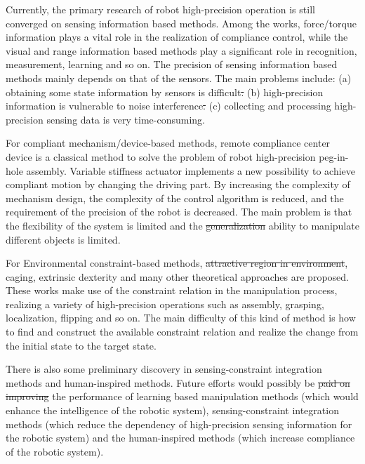 \documentclass[journal,twoside,web]{ieeecolor}
\providecommand{\DIFadd}[1]{{\protect\color{blue}\uwave{#1}}} %
\providecommand{\DIFdel}[1]{{\protect\color{red}\sout{#1}}}                      %
\providecommand{\DIFaddbegin}{} %
\providecommand{\DIFaddend}{} %
\providecommand{\DIFdelbegin}{} %
\providecommand{\DIFdelend}{} %
\newcommand{\DIFscaledelfig}{0.5}
\newlength{\DIFdelgraphicswidth} %
\newlength{\DIFdelgraphicsheight} %
\newcommand{\DIFaddincludegraphics}[2][]{{\color{blue}\fbox{\DIFOincludegraphics[#1]{#2}}}} %
\newcommand{\DIFdelincludegraphics}[2][]{%
\sbox{\DIFdelgraphicsbox}{\DIFOincludegraphics[#1]{#2}}%
\settoboxwidth{\DIFdelgraphicswidth}{\DIFdelgraphicsbox} %
\settoboxtotalheight{\DIFdelgraphicsheight}{\DIFdelgraphicsbox} %
\scalebox{\DIFscaledelfig}{%
\parbox[b]{\DIFdelgraphicswidth}{\usebox{\DIFdelgraphicsbox}\\[-\baselineskip] \rule{\DIFdelgraphicswidth}{0em}}\llap{\resizebox{\DIFdelgraphicswidth}{\DIFdelgraphicsheight}{%
\setlength{\unitlength}{\DIFdelgraphicswidth}%
\begin{picture}(1,1)%
\thicklines\linethickness{2pt} %
{\color[rgb]{1,0,0}\put(0,0){\framebox(1,1){}}}%
{\color[rgb]{1,0,0}\put(0,0){\line( 1,1){1}}}%
{\color[rgb]{1,0,0}\put(0,1){\line(1,-1){1}}}%
\end{picture}%
}\hspace*{3pt}}} %
} %
\DeclareRobustCommand{\DIFaddbegin}{\DIFOaddbegin \let\includegraphics\DIFaddincludegraphics} %
\DeclareRobustCommand{\DIFaddend}{\DIFOaddend \let\includegraphics\DIFOincludegraphics} %
\DeclareRobustCommand{\DIFdelbegin}{\DIFOdelbegin \let\includegraphics\DIFdelincludegraphics} %
\DeclareRobustCommand{\DIFdelend}{\DIFOaddend \let\includegraphics\DIFOincludegraphics} %
\begin{document}
Currently, the primary research of robot high-precision operation is still converged on sensing information based methods. 
Among the works, force/torque information plays a vital role in the realization of compliance control, while the visual and range information based methods play a significant role in recognition, measurement, learning and so on. 
The precision of sensing information based methods mainly depends on that of the sensors. 
The main problems include: 
(a) obtaining some state information by sensors is difficult\DIFdelbegin \DIFdel{. 
}\DIFdelend \DIFaddbegin \DIFadd{, 
}\DIFaddend (b) high-precision information is vulnerable to noise interference\DIFdelbegin \DIFdel{. 
}\DIFdelend \DIFaddbegin \DIFadd{, and  
}\DIFaddend (c) collecting and processing high-precision sensing data is very time-consuming.

For compliant mechanism/device-based methods, 
\DIFaddbegin \DIFadd{the }\DIFaddend remote compliance center device is a classical method to solve the problem of robot high-precision peg-in-hole assembly. 
Variable stiffness actuator implements a new possibility to achieve compliant motion by changing the driving part.
By increasing the complexity of \DIFaddbegin \DIFadd{the }\DIFaddend mechanism design, the complexity of the control algorithm is reduced, and the requirement of the precision of the robot is decreased. 
The main problem is that the flexibility of the system is limited and the \DIFdelbegin \DIFdel{generalization }\DIFdelend \DIFaddbegin \DIFadd{general }\DIFaddend ability to manipulate different objects is limited.

For Environmental constraint-based methods, \DIFdelbegin \DIFdel{attractive region in environment}\DIFdelend \DIFaddbegin \DIFadd{ARIE}\DIFaddend , caging, extrinsic dexterity and many other theoretical approaches are proposed.
These works make use of the constraint relation in the manipulation process, realizing a variety of high-precision operations such as assembly, grasping, localization, flipping and so on. 
The main difficulty of this kind of method is how to find and construct the available constraint relation and realize the change from the initial state to the target state.

There is also some preliminary discovery in sensing-constraint integration methods and human-inspired methods.
Future efforts would possibly be \DIFdelbegin \DIFdel{paid on improving }\DIFdelend \DIFaddbegin \DIFadd{funded to improve }\DIFaddend the performance of learning based manipulation methods (which would enhance the intelligence of the robotic system), sensing-constraint integration methods (which reduce the dependency of high-precision sensing information for the robotic system) and the human-inspired methods (which increase compliance of the robotic system).
\end{document}
